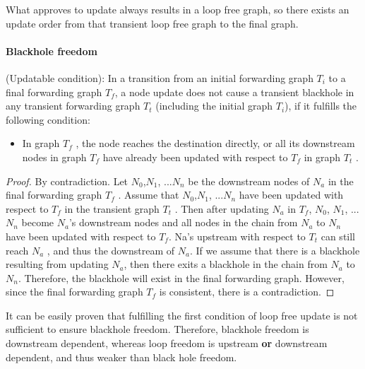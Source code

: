 
What \name approves to update always results in a loop free graph, so there exists an update order
from that transient loop free graph to the final graph.

\paragraph{Blackhole freedom} 

\begin{theorem} (Updatable condition): In a transition from an
initial forwarding graph $T_i$ to a final forwarding graph $T_f$, a node update
does not cause a transient blackhole in any transient forwarding graph $T_t$
(including the initial graph $T_i$), if it fulfills the following condition:
\begin{itemize}[noitemsep,topsep=0pt,leftmargin=*] 
\item In graph $T_f$ , the node reaches the destination
directly, or all its downstream nodes in graph $T_f$ have already been updated
with respect to $T_f$ in graph $T_t$ .  
\end{itemize} 
\end{theorem}

\begin{proof} By contradiction. Let $N_0$,$N_1$, ...$N_n$ be the downstream
nodes of $N_a$ in the final forwarding graph $T_f$ . Assume that $N_0$,$N_1$,
...$N_n$ have been updated with respect to $T_f$ in the transient graph $T_t$ .
Then after updating $N_a$ in $T_f$, $N_0$, $N_1$, ...$N_n$ become $N_a$'s
downstream nodes and 
all nodes in the chain from $N_a$ to $N_n$ have been updated with respect to $T_f$. 
Na's upstream with respect to $T_t$ can still reach $N_a$
, and thus the downstream of $N_a$.
If we assume that there is a blackhole resulting from updating $N_a$, then
there exits a blackhole in the chain from $N_a$ to $N_n$.
Therefore, the blackhole will
exist in the final forwarding graph. However, since the final forwarding graph
$T_f$ is consistent, there is a contradiction.
\end{proof}

It can be easily proven that fulfilling the first condition of loop free update is not sufficient 
to ensure blackhole freedom. 
Therefore, blackhole freedom is downstream dependent, whereas loop freedom is upstream 
\textbf{or} downstream dependent, and thus weaker than black hole freedom.

